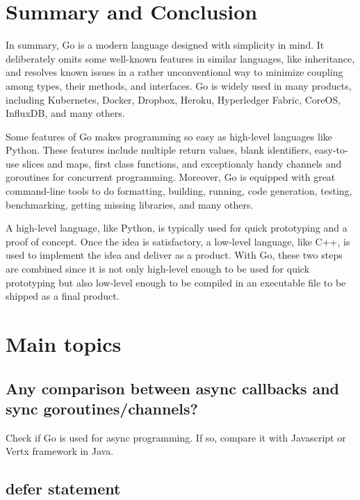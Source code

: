 \documentclass[11pt]{article}
\begin{document}
\section*{Summary and Conclusion}
\label{sec:orgheadline21}
In summary, Go is a modern language designed with simplicity in mind. It deliberately omits some well-known features in similar languages, like inheritance, and resolves known issues in a rather unconventional way to minimize coupling among types, their methods, and interfaces. Go is widely used in many products, including Kubernetes, Docker, Dropbox, Heroku, Hyperledger Fabric, CoreOS, InfluxDB, and many others.

Some features of Go makes programming so easy as high-level languages like Python. These features include multiple return values, blank identifiers, easy-to-use slices and maps, first class functions, and exceptionaly handy channels and goroutines for concurrent programming. Moreover, Go is equipped with great command-line tools to do formatting, building, running, code generation, testing, benchmarking, getting missing libraries, and many others.

A high-level language, like Python, is typically used for quick prototyping and a proof of concept. Once the idea is satisfactory, a low-level language, like C++, is used to implement the idea and deliver as a product. With Go, these two steps are combined since it is not only high-level enough to be used for quick prototyping but also low-level enough to be compiled in an executable file to be shipped as a final product.

\section*{Main topics}
\label{sec:orgheadline24}
\subsection*{Any comparison between async callbacks and sync goroutines/channels?}
\label{sec:orgheadline22}
Check if Go is used for async programming. If so, compare it with Javascript or Vertx framework in Java.
\subsection*{defer statement}
\label{sec:orgheadline23}
\end{document}
